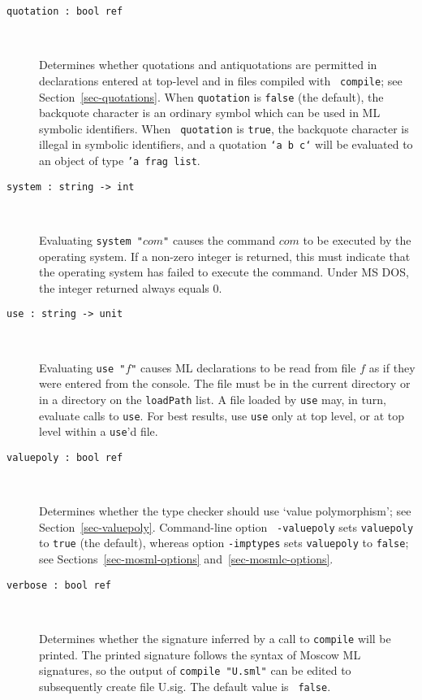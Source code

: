 \documentclass[fleqn,a4paper]{article}
\begin{document}
\begin{description}
\item[{\tt quotation :\ bool ref}]\mbox{ }

  Determines whether quotations and antiquotations are permitted in
  declarations entered at top-level and in files compiled with {\tt
    compile}; see Section~\ref{sec-quotations}.  When {\tt quotation}
  is {\tt false} (the default), the backquote character is an ordinary
  symbol which can be used in ML symbolic identifiers.  When {\tt
    quotation} is {\tt true}, the backquote character is illegal in
  symbolic identifiers, and a quotation {\tt `a b c`} will be
  evaluated to an object of type {\tt 'a frag list}.

\item[{\tt system :\ string -> int}]\mbox{ }

  Evaluating {\tt system "$com$"} causes the command $com$ to be
  executed by the operating system.  If a non-zero integer is
  returned, this must indicate that the operating system has failed to
  execute the command.  Under MS DOS, the integer returned always
  equals 0.

\item[{\tt use :\ string -> unit}]\mbox{ }

  Evaluating {\tt use "$f$"} causes ML declarations to be read from
  file $f$ as if they were entered from the console.  The file must be
  in the current directory or in a directory on the {\tt loadPath}
  list.  A file loaded by {\tt use} may, in turn, evaluate calls to
  {\tt use}.  For best results, use {\tt use} only at top level, or at
  top level within a {\tt use}'d file.

\item[{\tt valuepoly :\ bool ref}]\mbox{ }

  Determines whether the type checker should use `value polymorphism';
  see Section~\ref{sec-valuepoly}.  Command-line option {\tt
    -valuepoly} sets {\tt valuepoly} to {\tt true} (the default),
  whereas option {\tt -imptypes} sets {\tt valuepoly} to {\tt false};
  see Sections~\ref{sec-mosml-options} and~\ref{sec-mosmlc-options}.

\item[{\tt verbose :\ bool ref}]\mbox{ }

  Determines whether the signature inferred by a call to {\tt compile}
  will be printed.  The printed signature follows the syntax of Moscow
  ML signatures, so the output of {\tt compile "{\rm U.sml}"} can be
  edited to subsequently create file U.sig.  The default value is {\tt
    false}.
\end{description}
\end{document}
